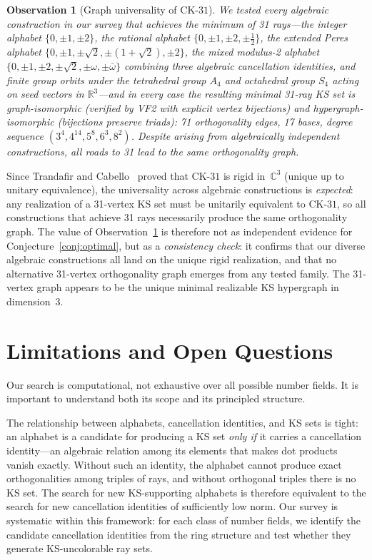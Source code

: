 \documentclass[12pt,a4paper]{article}
\newtheorem{observation}[theorem]{Observation}
\newcommand{\R}{\mathbb{R}}
\newcommand{\C}{\mathbb{C}}
\newcommand{\CK}{\mathrm{CK}\text{-}31}
\begin{document}
\begin{observation}[Graph universality of $\CK$]\label{obs:universality}
We tested every algebraic construction in our survey that achieves the minimum of 31 rays---the integer alphabet $\{0,\pm 1,\pm 2\}$, the rational alphabet $\{0,\pm 1,\pm 2,\pm\tfrac{1}{2}\}$, the extended Peres alphabet $\{0,\pm 1,\pm\sqrt{2},\pm(1+\sqrt{2}),\pm 2\}$, the mixed modulus-2 alphabet $\{0,\pm 1,\pm 2,\pm\sqrt{2},\pm\omega,\pm\bar\omega\}$ combining three algebraic cancellation identities, and finite group orbits under the tetrahedral group $A_4$ and octahedral group $S_4$ acting on seed vectors in $\R^3$---and in every case the resulting minimal 31-ray KS set is graph-isomorphic (verified by VF2 with explicit vertex bijections) and hypergraph-isomorphic (bijections preserve triads): 71 orthogonality edges, 17 bases, degree sequence $(3^4, 4^{14}, 5^8, 6^3, 8^2)$. Despite arising from algebraically independent constructions, all roads to 31 lead to the same orthogonality graph.
\end{observation}

Since Trandafir and Cabello~\cite{TrandafirCabello2025} proved that $\CK$ is rigid in~$\C^3$ (unique up to unitary equivalence), the universality across algebraic constructions is \emph{expected}: any realization of a 31-vertex KS set must be unitarily equivalent to $\CK$, so all constructions that achieve 31 rays necessarily produce the same orthogonality graph.  The value of Observation~\ref{obs:universality} is therefore not as independent evidence for Conjecture~\ref{conj:optimal}, but as a \emph{consistency check}: it confirms that our diverse algebraic constructions all land on the unique rigid realization, and that no alternative 31-vertex orthogonality graph emerges from any tested family.  The 31-vertex graph appears to be the unique minimal realizable KS hypergraph in dimension~3.

\section{Limitations and Open Questions}\label{sec:limitations}

Our search is computational, not exhaustive over all possible number fields.  It is important to understand both its scope and its principled structure.

The relationship between alphabets, cancellation identities, and KS sets is tight: an alphabet is a candidate for producing a KS set \emph{only if} it carries a cancellation identity---an algebraic relation among its elements that makes dot products vanish exactly.  Without such an identity, the alphabet cannot produce exact orthogonalities among triples of rays, and without orthogonal triples there is no KS set.  The search for new KS-supporting alphabets is therefore equivalent to the search for new cancellation identities of sufficiently low norm.  Our survey is systematic within this framework: for each class of number fields, we identify the candidate cancellation identities from the ring structure and test whether they generate KS-uncolorable ray sets.
\end{document}
